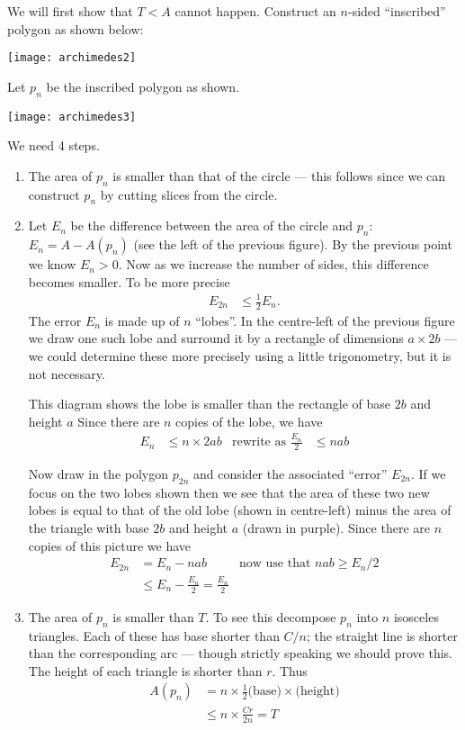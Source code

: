 We will first show that $T<A$ cannot happen. Construct an $n$-sided ``inscribed'' polygon
as shown below:
\begin{center}
 \texttt{[image: archimedes2]}
\end{center}
Let $p_n$ be the inscribed polygon as shown.
\begin{center}
 \texttt{[image: archimedes3]}
\end{center}
We need 4 steps.
\begin{enumerate}
 \item The area of $p_n$ is smaller than that of the circle --- this follows since we can
construct $p_n$ by cutting slices from the circle.
 \item Let $E_n$ be the difference between the area of the circle and $p_n$: $E_n = A -
A(p_n)$ (see the left of the previous figure). By the previous point we know $E_n>0$.
Now as we increase the number of sides, this difference becomes smaller. To be more
precise
  \begin{align*}
  E_{2n} & \leq \frac{1}{2} E_n.
  \end{align*}
The error $E_n$ is made up of $n$ ``lobes''. In the centre-left of the previous figure we
draw one such lobe and surround it by a rectangle of dimensions $a \times 2b$ --- we
could determine these more precisely using a little trigonometry, but it is not necessary.

This diagram shows the lobe is smaller than the rectangle of base $2b$ and height $a$
Since there are $n$ copies of the lobe, we have
\begin{align*}
  E_n & \leq n  \times 2ab & \text{rewrite as } \frac{E_n}{2} & \leq nab
\end{align*}

Now draw in the polygon $p_{2n}$ and consider the associated ``error'' $E_{2n}$. If we
focus on the two lobes shown then we see that the area of these two new lobes is equal to
that of the old lobe (shown in centre-left) minus the area of the triangle with base $2b$
and height $a$ (drawn in purple). Since there are $n$ copies of this
picture we have
\begin{align*}
  E_{2n} &= E_n - nab & \text{now use that $nab \geq  E_n/2$} \\
  & \leq E_n - \frac{E_n}{2} = \frac{E_n}{2}
\end{align*}

\item The area of $p_n$ is smaller than $T$. To see this decompose $p_n$ into $n$
isosceles triangles. Each of these has base shorter than $C/n$; the straight line is
shorter than the corresponding arc --- though strictly speaking we should prove this. The
height of each triangle is shorter than $r$. Thus
\begin{align*}
  A(p_n) &= n \times \frac{1}{2} \text{(base)}\times \text{(height)} \\
  & \leq n \times \frac{Cr}{2n} = T
\end{align*}


\end{enumerate}
